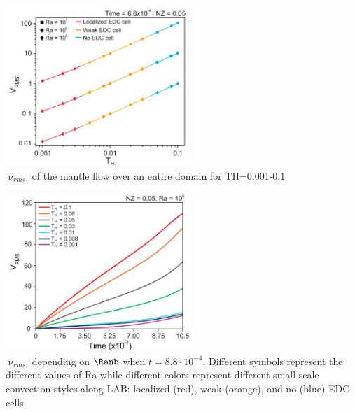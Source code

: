 \begin{center}
\includegraphics[width=7cm]{python_codes/fieldstone_168/images/kiso20d.jpg}\\
{\captionfont $\upnu_{rms}$ of the mantle flow over an entire domain for TH=0.001-0.1}
\end{center}

\begin{center}
\includegraphics[width=7cm]{python_codes/fieldstone_168/images/kiso20e.jpg}\\
{\captionfont 
$\upnu_{rms}$ depending on $\Ranb$ when $t=8.8\cdot10^{-4}$. Different symbols represent the
different values of Ra while different colors represent different small-scale
convection styles along LAB: localized (red), weak (orange), and no (blue) EDC
cells.}
\end{center}

